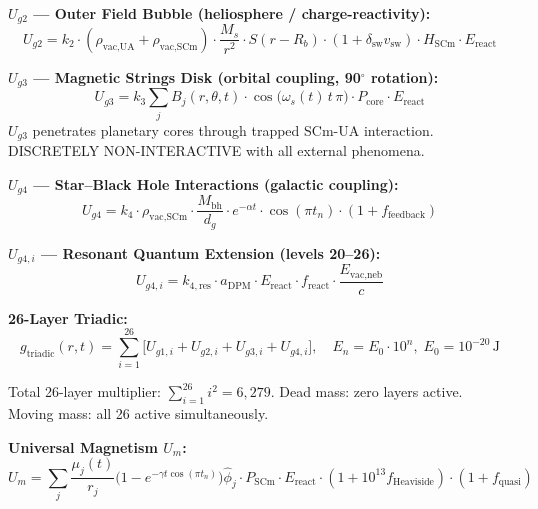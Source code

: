 \documentclass[12pt,a4paper]{article}
\begin{document}
\noindent\textbf{$U_{g2}$ --- Outer Field Bubble (heliosphere / charge-reactivity):}
\begin{equation}
  U_{g2} = k_2 \cdot (\rho_{\text{vac,UA}} + \rho_{\text{vac,SCm}}) \cdot \frac{M_s}{r^2}
    \cdot S(r{-}R_b) \cdot (1+\delta_{\text{sw}}v_{\text{sw}}) \cdot H_{\text{SCm}} \cdot E_{\text{react}}
  \label{eq:ug2}
\end{equation}

\noindent\textbf{$U_{g3}$ --- Magnetic Strings Disk (orbital coupling, 90$^\circ$ rotation):}
\begin{equation}
  U_{g3} = k_3 \sum_j B_j(r,\theta,t) \cdot \cos\!\bigl(\omega_s(t)\,t\,\pi\bigr)
    \cdot P_{\text{core}} \cdot E_{\text{react}}
  \label{eq:ug3}
\end{equation}
$U_{g3}$ penetrates planetary cores through trapped SCm-UA interaction.
DISCRETELY NON-INTERACTIVE with all external phenomena.

\noindent\textbf{$U_{g4}$ --- Star--Black Hole Interactions (galactic coupling):}
\begin{equation}
  U_{g4} = k_4 \cdot \rho_{\text{vac,SCm}} \cdot \frac{M_{\text{bh}}}{d_g}
    \cdot e^{-\alpha t} \cdot \cos(\pi t_n) \cdot (1+f_{\text{feedback}})
  \label{eq:ug4}
\end{equation}

\noindent\textbf{$U_{g4,i}$ --- Resonant Quantum Extension (levels 20--26):}
\begin{equation}
  U_{g4,i} = k_{4,\text{res}} \cdot a_{\text{DPM}} \cdot E_{\text{react}}
    \cdot f_{\text{react}} \cdot \frac{E_{\text{vac,neb}}}{c}
  \label{eq:ug4i}
\end{equation}

\noindent\textbf{26-Layer Triadic:}
\begin{equation}
  g_{\text{triadic}}(r,t) = \sum_{i=1}^{26}\bigl[U_{g1,i} + U_{g2,i} + U_{g3,i} + U_{g4,i}\bigr],
  \quad
  E_n = E_0 \cdot 10^n,\; E_0 = 10^{-20}\,\text{J}
  \label{eq:triadic}
\end{equation}

Total 26-layer multiplier: $\sum_{i=1}^{26} i^2 = 6{,}279$.
Dead mass: zero layers active.  Moving mass: all 26 active simultaneously.

\noindent\textbf{Universal Magnetism $U_m$:}
\begin{equation}
  U_m = \sum_j \frac{\mu_j(t)}{r_j}
    \bigl(1 - e^{-\gamma t \cos(\pi t_n)}\bigr)\hat{\phi}_j
    \cdot P_{\text{SCm}} \cdot E_{\text{react}}
    \cdot (1 + 10^{13} f_{\text{Heaviside}}) \cdot (1+f_{\text{quasi}})
  \label{eq:um}
\end{equation}
\end{document}

